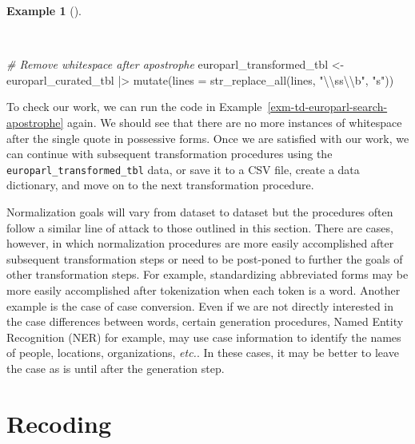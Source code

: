 \documentclass[
  letterpaper,
  DIV=11,
  numbers=noendperiod]{scrreport}
\newenvironment{Shaded}{\begin{snugshade}}{\end{snugshade}}
\newcommand{\AttributeTok}[1]{\textcolor[rgb]{0.00,0.00,0.00}{#1}}
\newcommand{\CommentTok}[1]{\textcolor[rgb]{0.00,0.00,0.00}{\textit{#1}}}
\newcommand{\FunctionTok}[1]{\textcolor[rgb]{0.00,0.00,0.00}{#1}}
\newcommand{\NormalTok}[1]{\textcolor[rgb]{0.00,0.00,0.00}{#1}}
\newcommand{\OtherTok}[1]{\textcolor[rgb]{0.00,0.00,0.00}{#1}}
\newcommand{\SpecialCharTok}[1]{\textcolor[rgb]{0.00,0.00,0.00}{#1}}
\newcommand{\StringTok}[1]{\textcolor[rgb]{0.00,0.00,0.00}{#1}}
\theoremstyle{definition}
\newtheorem{example}{Example}[chapter]
\theoremstyle{remark}
\begin{document}
\begin{example}[]\protect\hypertarget{exm-td-europarl-remove-apostrophe}{}\label{exm-td-europarl-remove-apostrophe}

~

\begin{Shaded}
\begin{Highlighting}[]
\CommentTok{\# Remove whitespace after apostrophe}
\NormalTok{europarl\_transformed\_tbl }\OtherTok{\textless{}{-}} 
\NormalTok{  europarl\_curated\_tbl }\SpecialCharTok{|\textgreater{}}
  \FunctionTok{mutate}\NormalTok{(}\AttributeTok{lines =} \FunctionTok{str\_replace\_all}\NormalTok{(lines, }\StringTok{"\textquotesingle{}}\SpecialCharTok{\textbackslash{}\textbackslash{}}\StringTok{ss}\SpecialCharTok{\textbackslash{}\textbackslash{}}\StringTok{b"}\NormalTok{, }\StringTok{"\textquotesingle{}s"}\NormalTok{))}
\end{Highlighting}
\end{Shaded}

\end{example}

To check our work, we can run the code in
Example~\ref{exm-td-europarl-search-apostrophe} again. We should see
that there are no more instances of whitespace after the single quote in
possessive forms. Once we are satisfied with our work, we can continue
with subsequent transformation procedures using the
\texttt{europarl\_transformed\_tbl} data, or save it to a CSV file,
create a data dictionary, and move on to the next transformation
procedure.

Normalization goals will vary from dataset to dataset but the procedures
often follow a similar line of attack to those outlined in this section.
There are cases, however, in which normalization procedures are more
easily accomplished after subsequent transformation steps or need to be
post-poned to further the goals of other transformation steps. For
example, standardizing abbreviated forms may be more easily accomplished
after tokenization when each token is a word. Another example is the
case of case conversion. Even if we are not directly interested in the
case differences between words, certain generation procedures, Named
Entity Recognition (NER) for example, may use case information to
identify the names of people, locations, organizations, \emph{etc.}. In
these cases, it may be better to leave the case as is until after the
generation step.

\hypertarget{sec-td-recoding}{%
\section{Recoding}\label{sec-td-recoding}}
\end{document}
